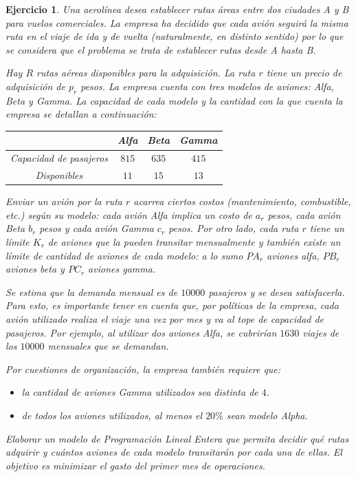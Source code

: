 \documentclass[a4paper,oneside,12pt]{amsart}
\newtheorem{quest}{Ejercicio}
\begin{document}
\begin{quest}
    Una aerolínea desea establecer rutas áreas entre dos ciudades A y B para vuelos comerciales. La empresa ha decidido que cada avión seguirá la misma ruta en el viaje de ida y de vuelta (naturalmente, en distinto sentido) por lo que se considera que el problema se trata de establecer rutas desde A hasta B.
    
    Hay $R$ rutas aéreas disponibles para la adquisición. La ruta $r$ tiene un precio de adquisición de $p_r$ pesos. 
    La empresa cuenta con tres modelos de aviones: Alfa, Beta y Gamma. La capacidad de cada modelo y la cantidad con la que cuenta la empresa se detallan a continuación:
    \begin{table}[h!]
        \centering
        \begin{tabular}{cccc}
             & Alfa & Beta & Gamma  \\\midrule
            Capacidad de pasajeros & $815$ & $635$ & $415$ \\
            Disponibles & $11$ & $15$ & $13$
        \end{tabular}
    \end{table}
    
    Enviar un avión por la ruta $r$ acarrea ciertos costos (mantenimiento, combustible, etc.) según su modelo: cada avión Alfa implica un costo de $a_r$ pesos, cada avión Beta $b_r$ pesos y cada avión Gamma $c_r$ pesos. Por otro lado, cada ruta $r$ tiene un límite $K_r$ de aviones que la pueden transitar mensualmente y también existe un límite de cantidad de aviones de cada modelo: a lo sumo $PA_r$ aviones alfa, $PB_r$ aviones beta y $PC_r$ aviones gamma.
    
    Se estima que la demanda mensual es de $10000$ pasajeros y se desea satisfacerla. Para esto, es importante tener en cuenta que, por políticas de la empresa, cada avión utilizado realiza el viaje una vez por mes y va al tope de capacidad de pasajeros. Por ejemplo, al utilizar dos aviones Alfa, se cubrirían $1630$ viajes de los $10000$ mensuales que se demandan.
    
    Por cuestiones de organización, la empresa también requiere que:
    \begin{itemize}
        \item la cantidad de aviones Gamma utilizados sea distinta de $4$.
        \item de todos los aviones utilizados, al menos el $20\%$ sean modelo Alpha.
    \end{itemize}
    
    Elaborar un modelo de Programación Lineal Entera que permita decidir qué rutas adquirir y cuántos aviones de cada modelo transitarán por cada una de ellas. El objetivo es minimizar el gasto del primer mes de operaciones.
\end{quest}
\end{document}
